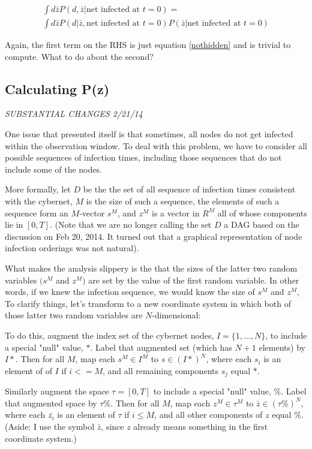 \documentclass{article}
\begin{document}
\begin{align}
\int d\bar{z} P(d, \bar{z} | \text{net infected at } t = 0) = \\ 
\int d\bar{z} P(d | \bar{z}, \text{net infected at } t = 0) P(\bar{z} | \text{net infected at } t=0)
\label{main}
\end{align}

Again, the first term on the RHS is just equation \ref{nothidden} and 
          is trivial to compute.  What to do about the second?

\subsection{Calculating P(z)}

\emph{SUBSTANTIAL CHANGES 2/21/14}

    One issue that presented itself is that sometimes, all nodes do not get infected within
    the observation window.  To deal with this problem, we have to consider all possible sequences
    of infection times, including those sequences that do not include some of the nodes.  

    More formally, let $D$ be the the set of all sequence of infection times consistent with 
    the cybernet, $M$ is the size of such a sequence, the elements of such a sequence form an 
    $M$-vector $s^M$, and $z^M$ is a vector in $R^M$ all of whose components lie in 
    $[0, T]$. (Note that we are no longer calling the set $D$ a DAG based on the discussion on
    Feb 20, 2014. It turned out that a graphical representation of node infection orderings
    was not natural).

    What makes the analysis slippery is the that the sizes of the latter
    two random variables $(s^M$ and $z^M)$ are set by the value of the
    first random variable. In other words, if we knew the infection sequence, we would know 
    the size of $s^M$ and $z^M$,  To clarify things, let's transform to a new coordinate system 
    in which both of those latter two random variables are $N$-dimensional:

    To do this, augment the index set of the cybernet nodes, $I = \{1, ..., N\}$, to include a special "null"
    value, $*$. Label that augmented set (which has $N+1$ elements) by $I*$.
    Then for all $M$, map each $s^M \in I^M$ to $s \in (I*)^N$, where each $s_i$ is an element of
    of $I$ if $i <= M$, and all remaining components $s_j$ equal $*$.

    Similarly augment the space $\tau = [0, T]$ to include a special "null" value, $\%$.
    Label that augmented space by $\tau\%$. Then for all $M$, map each $z^M \in \tau^M$ to
    $\bar{z} \in (\tau\%)^N$, where each $\bar{z_i}$ is an element of $\tau$ if $i \leq M$, and all other
    components of $z$ equal $\%$. (Aside: I use the symbol $\bar{z}$, since $z$ already means
    something in the first coordinate system.)
\end{document}
